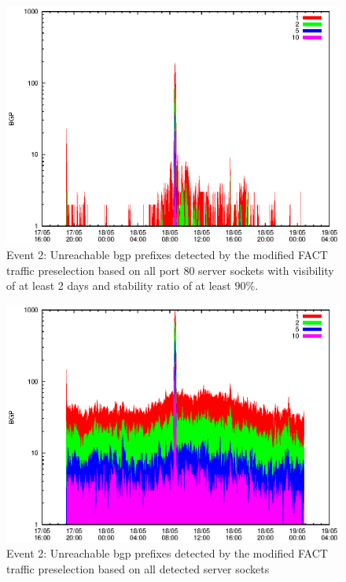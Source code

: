\begin{figure}
	[p] \centering 
	\includegraphics[width=0.75\linewidth]{images/events/2010_05_18/bgp_log_port80_Set_stab_9_vts_2.eps} \caption{Event 2: Unreachable \gls{bgp} prefixes detected by the modified \gls{FACT} traffic preselection based on all port 80 \glspl{server socket} with visibility of at least 2 days and stability ratio of at least $90\%$.} 
	\label{fig:TIER1_FACT_allSES80VTS2STAB9} 
\end{figure}
\begin{figure}
	[p] \centering 
	\includegraphics[width=0.75\linewidth]{images/events/2010_05_18/bgp_log_all_external.eps} \caption{Event 2: Unreachable \gls{bgp} prefixes detected by the modified \gls{FACT} traffic preselection based on all detected \glspl{server socket}} 
	\label{fig:TIER1_FACT_allSES} 
\end{figure}
